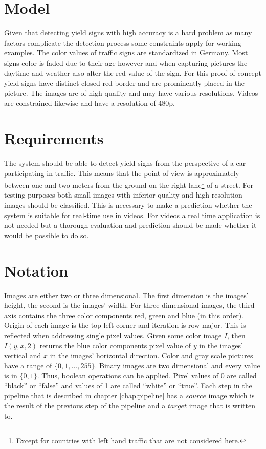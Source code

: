 \documentclass{report}
\begin{document}
\section{Model}

Given that detecting yield signs with high accuracy is a hard problem
as many factors complicate the detection process some constraints
apply for working examples. The color values of traffic signs are
standardized in Germany. Most signs color is faded due to their age
however and when capturing pictures the daytime and weather also alter
the red value of the sign. For this proof of concept yield signs have
distinct closed red border and are prominently placed in the
picture. The images are of high quality and may have various
resolutions. Videos are constrained likewise and have a resolution of
480p.


\section{Requirements}

The system should be able to detect yield signs from the perspective
of a car participating in traffic. This means that the point of view
is approximately between one and two meters from the ground on the
right lane\footnote{Except for countries with left hand traffic that
  are not considered here.} of a street. For testing purposes both
small images with inferior quality and high resolution images should
be classified. This is necessary to make a prediction whether the
system is suitable for real-time use in videos. For videos a real time
application is not needed but a thorough evaluation and prediction
should be made whether it would be possible to do so.

\section{Notation}

Images are either two or three dimensional. The first dimension is the
images' height, the second is the images' width. For three dimensional
images, the third axis contains the three color components red, green
and blue (in this order). Origin of each image is the top left corner
and iteration is row-major. This is reflected when addressing single
pixel values. Given some color image \( I \), then \( I(y, x, 2) \)
returns the blue color components pixel value of \( y \) in the
images' vertical and \( x \) in the images' horizontal
direction. Color and gray scale pictures have a range of \( \{0, 1,
..., 255\} \).  Binary images are two dimensional and every value is
in \(\{ 0, 1 \}\). Thus, boolean operations can be applied. Pixel
values of 0 are called ``black'' or ``false'' and values of 1 are
called ``white'' or ``true''. Each step in the pipeline that is
described in chapter \ref{chap:pipeline} has a \( source \) image
which is the result of the previous step of the pipeline and a \(
target \) image that is written to.
\end{document}
